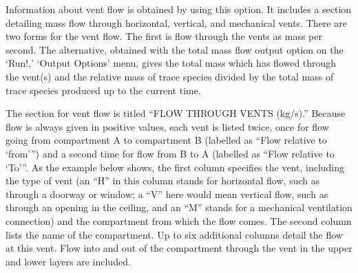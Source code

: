 Information about vent flow is obtained by using this option.  It includes a section detailing mass flow through horizontal, vertical, and mechanical vents. There are two forms for the vent flow. The first is flow through the vents as mass per second. The alternative, obtained with the total mass flow output option on the `Run!,' `Output Options' menu, gives the total mass which has flowed through the vent(s) and the relative mass of trace species divided by the total mass of trace species produced up to the current time.

The section for vent flow is titled ``FLOW THROUGH VENTS (kg/s).''  Because flow is always given in positive values, each vent is listed twice, once for flow going from compartment A to compartment B (labelled as ``Flow relative to `from''') and a second time for flow from B to A (labelled as ``Flow relative to `To'''.  As the example below shows, the first column specifies the vent, including the type of vent (an ``H'' in this column stands for horizontal flow, such as through a doorway or window; a ``V'' here would mean vertical flow, such as through an opening in the ceiling, and an ``M'' stands for a mechanical ventilation connection) and the compartment from which the flow comes. The second column lists the name of the compartment. Up to six additional columns detail the flow at this vent. Flow into and out of the compartment through the vent in the upper and lower layers are included.

